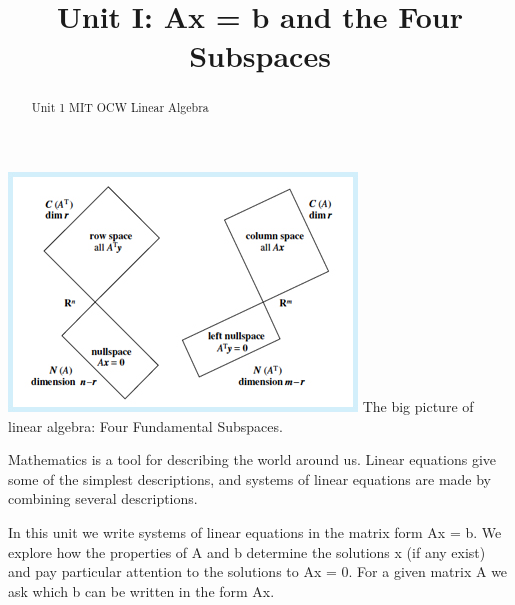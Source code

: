 \documentclass{ximera}
\title{Unit I: Ax = b and the Four Subspaces}
\begin{document}
\begin{abstract}
  Unit 1 MIT OCW Linear Algebra
\end{abstract}\maketitle

\vspace{2 mm}

\begin{center}
\includegraphics{Unit_1_WIDE.jpg}
The big picture of linear algebra: Four Fundamental Subspaces.
\end{center}

\noindent
Mathematics is a tool for describing the world around us. Linear equations give some of the simplest descriptions, and systems of linear equations are made by combining several descriptions.

\vspace{5 mm}

\noindent
In this unit we write systems of linear equations in the matrix form Ax = b. We explore how the properties of A and b determine the solutions x (if any exist) and pay particular attention to the solutions to Ax = 0. For a given matrix A we ask which b can be written in the form Ax.
\end{document}
